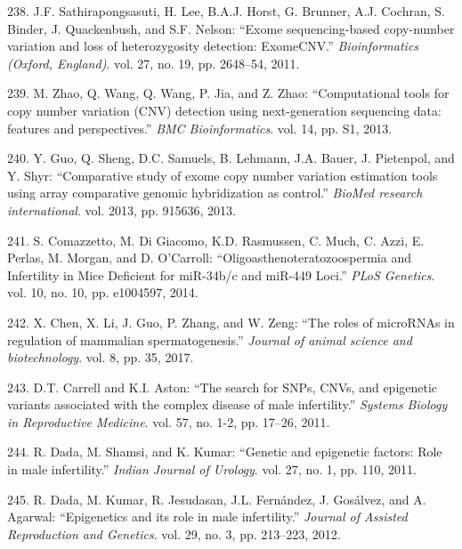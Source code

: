 \documentclass[12pt,a4paper,twoside]{ugathesis}
\theoremstyle{definition}
\theoremstyle{definition}
\theoremstyle{definition}
\theoremstyle{remark}
\begin{document}
\hypertarget{ref-Sathirapongsasuti2011}{}
238. J.F. Sathirapongsasuti, H. Lee, B.A.J. Horst, G. Brunner, A.J.
Cochran, S. Binder, J. Quackenbush, and S.F. Nelson: ``Exome
sequencing-based copy-number variation and loss of heterozygosity
detection: ExomeCNV.'' \emph{Bioinformatics (Oxford, England)}. vol. 27,
no. 19, pp. 2648--54, 2011.

\hypertarget{ref-Zhao2013}{}
239. M. Zhao, Q. Wang, Q. Wang, P. Jia, and Z. Zhao: ``Computational
tools for copy number variation (CNV) detection using next-generation
sequencing data: features and perspectives.'' \emph{BMC Bioinformatics}.
vol. 14, pp. S1, 2013.

\hypertarget{ref-Guo2013}{}
240. Y. Guo, Q. Sheng, D.C. Samuels, B. Lehmann, J.A. Bauer, J.
Pietenpol, and Y. Shyr: ``Comparative study of exome copy number
variation estimation tools using array comparative genomic hybridization
as control.'' \emph{BioMed research international}. vol. 2013, pp.
915636, 2013.

\hypertarget{ref-Comazzetto2014}{}
241. S. Comazzetto, M. Di Giacomo, K.D. Rasmussen, C. Much, C. Azzi, E.
Perlas, M. Morgan, and D. O'Carroll: ``Oligoasthenoteratozoospermia and
Infertility in Mice Deficient for miR-34b/c and miR-449 Loci.''
\emph{PLoS Genetics}. vol. 10, no. 10, pp. e1004597, 2014.

\hypertarget{ref-Chen2017}{}
242. X. Chen, X. Li, J. Guo, P. Zhang, and W. Zeng: ``The roles of
microRNAs in regulation of mammalian spermatogenesis.'' \emph{Journal of
animal science and biotechnology}. vol. 8, pp. 35, 2017.

\hypertarget{ref-Carrell2011}{}
243. D.T. Carrell and K.I. Aston: ``The search for SNPs, CNVs, and
epigenetic variants associated with the complex disease of male
infertility.'' \emph{Systems Biology in Reproductive Medicine}. vol. 57,
no. 1-2, pp. 17--26, 2011.

\hypertarget{ref-Dada2011}{}
244. R. Dada, M. Shamsi, and K. Kumar: ``Genetic and epigenetic factors:
Role in male infertility.'' \emph{Indian Journal of Urology}. vol. 27,
no. 1, pp. 110, 2011.

\hypertarget{ref-Dada2012}{}
245. R. Dada, M. Kumar, R. Jesudasan, J.L. Fernández, J. Gosálvez, and
A. Agarwal: ``Epigenetics and its role in male infertility.''
\emph{Journal of Assisted Reproduction and Genetics}. vol. 29, no. 3,
pp. 213--223, 2012.


\end{document}
